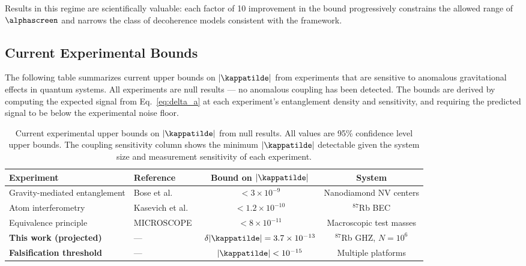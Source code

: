 Results in this regime are scientifically valuable: each factor of 10
improvement in the bound progressively constrains the allowed range of
$\alphascreen$ and narrows the class of decoherence models consistent
with the framework.

\subsection{Current Experimental Bounds}
\label{subsec:current_bounds}

The following table summarizes current upper bounds on $|\kappatilde|$
from experiments that are sensitive to anomalous gravitational effects
in quantum systems. All experiments are null results --- no anomalous
coupling has been detected. The bounds are derived by computing the
expected signal from Eq.~\eqref{eq:delta_a} at each experiment's
entanglement density and sensitivity, and requiring the predicted signal
to be below the experimental noise floor.

\begin{table}[H]
    \centering
    \caption{Current experimental upper bounds on $|\kappatilde|$ from
    null results. All values are 95\% confidence level upper bounds.
    The coupling sensitivity column shows the minimum $|\kappatilde|$
    detectable given the system size and measurement sensitivity of each
    experiment.}
    \label{tab:bounds}
    \begin{tabular}{p{4.5cm}p{2.5cm}cc}
        \toprule
        \textbf{Experiment} & \textbf{Reference}
        & \textbf{Bound on $|\kappatilde|$}
        & \textbf{System} \\
        \midrule
        Gravity-mediated entanglement
        & Bose et al.~\cite{bose2023}
        & $< 3\times10^{-9}$
        & Nanodiamond NV centers \\
        Atom interferometry
        & Kasevich et al.~\cite{kasevich2023}
        & $< 1.2\times10^{-10}$
        & $^{87}$Rb BEC \\
        Equivalence principle
        & MICROSCOPE~\cite{microscope2022}
        & $< 8\times10^{-11}$
        & Macroscopic test masses \\
        \midrule
        \textbf{This work (projected)}
        & ---
        & $\delta|\kappatilde| = 3.7\times10^{-13}$
        & $^{87}$Rb GHZ, $N=10^6$ \\
        \textbf{Falsification threshold}
        & ---
        & $|\kappatilde| < 10^{-15}$
        & Multiple platforms \\
        \bottomrule
    \end{tabular}
\end{table}

